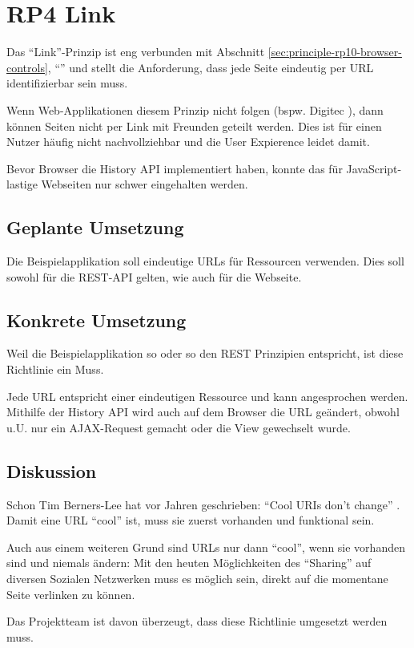 \section{RP4 Link}
\label{sec:principle-rp4-link}

Das ``Link''-Prinzip ist eng verbunden mit Abschnitt \ref{sec:principle-rp10-browser-controls}, ``'' und stellt die Anforderung, dass jede Seite eindeutig per \gls{URL} identifizierbar sein muss.

Wenn Web-Applikationen diesem Prinzip nicht folgen (bspw. Digitec \cite{Digitec}), dann können Seiten nicht per Link mit Freunden geteilt werden.
Dies ist für einen Nutzer häufig nicht nachvollziehbar und die User Expierence leidet damit.

Bevor Browser die History API \cite{HistoryAPI} implementiert haben, konnte das für JavaScript-lastige Webseiten nur schwer eingehalten werden.

\subsection*{Geplante Umsetzung}
Die Beispielapplikation soll eindeutige URLs für Ressourcen verwenden. Dies soll sowohl für die REST-API gelten, wie auch für die Webseite.

\subsection*{Konkrete Umsetzung}
Weil die Beispielapplikation so oder so den REST \cite{REST} Prinzipien entspricht, ist diese Richtlinie ein Muss.

Jede URL entspricht einer eindeutigen Ressource und kann angesprochen werden.
Mithilfe der History API \cite{HistoryAPI} wird auch auf dem Browser die URL
geändert, obwohl u.U. nur ein AJAX-Request gemacht oder die View gewechselt wurde.

\subsection*{Diskussion}
Schon Tim Berners-Lee hat vor Jahren geschrieben: ``Cool URIs don't change'' \cite{CoolURIsTBL}.
Damit eine URL ``cool'' ist, muss sie zuerst vorhanden und funktional sein.

Auch aus einem weiteren Grund sind URLs nur dann ``cool'', wenn sie vorhanden sind
und niemals ändern: Mit den heuten Möglichkeiten des ``Sharing'' auf diversen Sozialen
Netzwerken muss es möglich sein, direkt auf die momentane Seite verlinken zu können.

Das Projektteam ist davon überzeugt, dass diese Richtlinie umgesetzt werden muss.